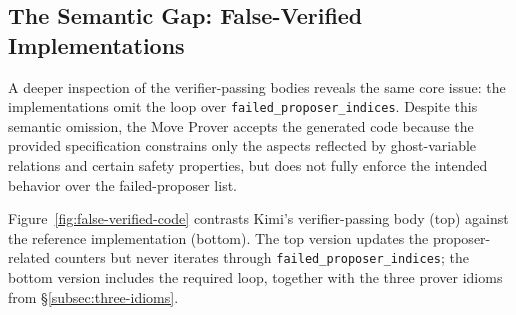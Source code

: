 \subsection{The Semantic Gap: False-Verified Implementations}\label{subsec:false-verified}

A deeper inspection of the verifier-passing bodies reveals the same core issue: the implementations omit the loop over \texttt{failed\_proposer\_indices}.
Despite this semantic omission, the Move Prover accepts the generated code because the provided specification constrains only the aspects reflected by ghost-variable relations and certain safety properties, but does not fully enforce the intended behavior over the failed-proposer list.

Figure~\ref{fig:false-verified-code} contrasts Kimi's verifier-passing body (top) against the reference implementation (bottom).
The top version updates the proposer-related counters but never iterates through \texttt{failed\_proposer\_indices};
the bottom version includes the required loop, together with the three prover idioms from \S\ref{subsec:three-idioms}.


